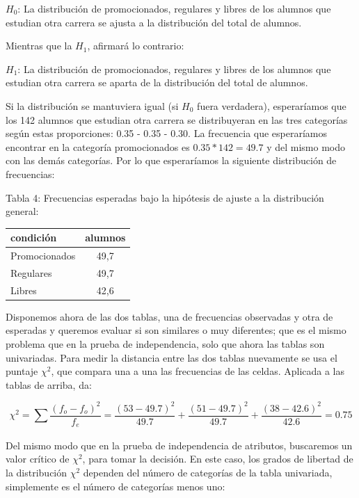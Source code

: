 \documentclass[]{book}
\begin{document}
\(H_0\): La distribución de promocionados, regulares y libres de los alumnos que estudian otra carrera se ajusta a la distribución del total de alumnos.

Mientras que la \(H_1\), afirmará lo contrario:

\(H_1\): La distribución de promocionados, regulares y libres de los alumnos que estudian otra carrera se aparta de la distribución del
total de alumnos.

Si la distribución se mantuviera igual (si \(H_0\) fuera verdadera),
esperaríamos que los 142 alumnos que estudian otra carrera se
distribuyeran en las tres categorías según estas proporciones: 0.35 -
0.35 - 0.30. La frecuencia que esperaríamos encontrar en la categoría
promocionados es \(0.35*142= 49.7\) y del mismo modo con las demás
categorías. Por lo que esperaríamos la siguiente distribución de
frecuencias:

Tabla 4: Frecuencias esperadas bajo la hipótesis de ajuste a la
distribución general:

\begin{table}[H]
\centering
\begin{tabular}{lc}
\toprule
condición & alumnos\\
\midrule
\rowcolor{gray!6}  Promocionados & 49,7\\
Regulares & 49,7\\
\rowcolor{gray!6}  Libres & 42,6\\
\bottomrule
\end{tabular}
\end{table}

Disponemos ahora de las dos tablas, una de frecuencias observadas y otra
de esperadas y queremos evaluar si son similares o muy diferentes; que
es el mismo problema que en la prueba de independencia, solo que ahora
las tablas son univariadas. Para medir la distancia entre las dos tablas
nuevamente se usa el puntaje \(\chi^{2}\), que compara una a una las
frecuencias de las celdas. Aplicada a las tablas de arriba, da:

\[\chi^{2} = \sum_{}^{}{\frac{(f_{o} - f_{o} )^{2}}{f_{e}} = \frac{( 53 - 49.7 )^{2}}{49.7} + \frac{( 51 - 49.7)^{2}}{49.7} + \frac{( 38 - 42.6)^{2}}{42.6}} =0.75\]

Del mismo modo que en la prueba de independencia de atributos,
buscaremos un valor crítico de \(\chi^{2}\), para tomar la decisión. En
este caso, los grados de libertad de la distribución \(\chi^{2}\) dependen
del número de categorías de la tabla univariada, simplemente es el
número de categorías menos uno:
\end{document}
